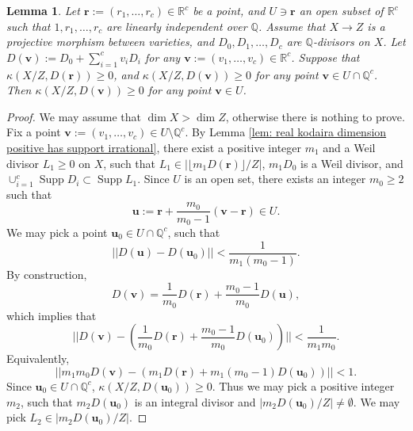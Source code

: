 \documentclass[11pt]{amsart}
\numberwithin{equation}{section}
\newcommand{\Qq}{\mathbb{Q}}
\newcommand{\Rr}{\mathbb{R}}
\newcommand{\Supp}{\operatorname{Supp}}
\newtheorem{lem}[thm]{Lemma}
\theoremstyle{definition}
\theoremstyle{definition}
\begin{document}
\begin{lem}\label{lem: rational kod geq 0 and central kod geq 0 imply kod geq 0 on open set}
Let $\bm{r}:=(r_1,\dots,r_c)\in\Rr^c$ be a point, and $U\ni\bm{r}$ an open subset of $\Rr^c$ such that $1,r_1,\dots,r_c$ are linearly independent over $\Qq$. Assume that $X\rightarrow Z$ is a projective morphism between varieties, and $D_0,D_1,\dots,D_c$ are $\Qq$-divisors on $X$. Let $D(\bm{v}):=D_0+\sum_{i=1}^cv_iD_i$ for any $\bm{v}:=(v_1,\dots,v_c)\in\Rr^c$. Suppose that $\kappa(X/Z,D(\bm{r}))\geq 0$, and $\kappa(X/Z,D(\bm{v}))\geq 0$ for any point $\bm{v}\in U\cap\Qq^c$. Then $\kappa(X/Z,D(\bm{v}))\geq 0$ for any point $\bm{v}\in U$.
\end{lem}
\begin{proof}
We may assume that $\dim X>\dim Z$, otherwise there is nothing to prove. Fix a point $\bm{v}:=(v_1,\dots,v_c)\in U\setminus\Qq^c$. By Lemma \ref{lem: real kodaira dimension positive has support irrational}, there exist a positive integer $m_1$ and a Weil divisor $L_1\geq 0$ on $X$, such that $L_1\in |\lfloor m_1D(\bm{r})\rfloor/Z|$, $m_1D_0$ is a Weil divisor, and $\cup_{i=1}^c\Supp D_i\subset\Supp L_1$. Since $U$ is an open set, there exists an integer $m_0\geq 2$ such that $$\bm{u}:=\bm{r}+\frac{m_0}{m_0-1}(\bm{v}-\bm{r})\in U.$$
We may pick a point $\bm{u}_0\in U\cap\Qq^c$, such that $$||D(\bm{u})-D(\bm{u}_0)||<\frac{1}{m_1(m_0-1)}.$$
By construction,
$$D(\bm{v})=\frac{1}{m_0}D(\bm{r})+\frac{m_0-1}{m_0}D(\bm{u}),$$
which implies that
 $$||D(\bm{v})-(\frac{1}{m_0}D(\bm{r})+\frac{m_0-1}{m_0}D(\bm{u}_0))||<\frac{1}{m_1m_0}.$$
Equivalently,
$$||m_1m_0D(\bm{v})-(m_1D(\bm{r})+m_1(m_0-1)D(\bm{u}_0))||<1.$$
Since $\bm{u}_0\in U\cap\Qq^c$, $\kappa(X/Z,D(\bm{u}_0))\geq 0$. Thus we may pick a positive integer $m_2$, such that $m_2D(\bm{u}_0)$ is an integral divisor and $|m_2D(\bm{u}_0)/Z|\not=\emptyset$. We may pick $L_2\in |m_2D(\bm{u}_0)/Z|$. 


\end{proof}
\end{document}
